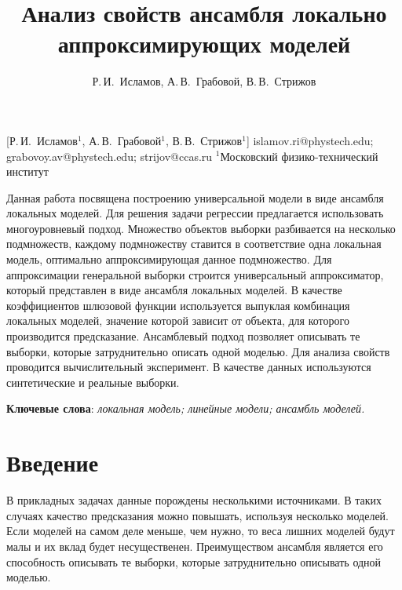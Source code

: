 \documentclass[12pt, twoside]{article}
\begin{document}
\title
    [Анализ свойств ансамбля локально аппроксимирующих моделей] %
    {Анализ свойств ансамбля локально аппроксимирующих моделей}
\author
    [Р.\,И.~Исламов, А.\,В.~Грабовой, В.\,В.~Стрижов] %
    {Р.\,И.~Исламов, А.\,В.~Грабовой, В.\,В.~Стрижов} %
    [Р.\,И.~Исламов$^1$, А.\,В.~Грабовой$^1$, В.\,В.~Стрижов$^{1}$] %
\email
    {islamov.ri@phystech.edu; grabovoy.av@phystech.edu;  strijov@ccas.ru}
\organization
    {$^1$Московский физико-технический институт}
\abstract
    {Данная работа посвящена построению универсальной модели в виде ансамбля локальных моделей. Для решения задачи регрессии  предлагается использовать многоуровневый подход. Множество объектов выборки разбивается на несколько подмножеств, каждому подмножеству ставится в соответствие одна локальная модель, оптимально аппроксимирующая данное подмножество. Для аппроксимации генеральной выборки строится универсальный аппроксиматор, который представлен в виде ансамбля локальных моделей. В качестве коэффициентов шлюзовой функции используется выпуклая комбинация локальных моделей, значение которой зависит от объекта, для которого производится предсказание. Ансамблевый подход позволяет описывать те выборки, которые затруднительно описать одной моделью. Для анализа свойств проводится вычислительный эксперимент. В качестве данных используются синтетические и реальные выборки.   
	
\bigskip
\noindent
\textbf{Ключевые слова}: \emph {локальная модель; линейные модели; ансамбль моделей.}
}

\maketitle
\linenumbers

\section{Введение}

В прикладных задачах данные порождены несколькими источниками. В таких случаях качество предсказания можно повышать, используя несколько моделей. Если моделей на самом деле меньше, чем нужно, то веса лишних моделей будут малы и их вклад будет несущественен. Преимуществом ансамбля является его способность описывать те выборки, которые затруднительно описывать одной моделью.
\end{document}
